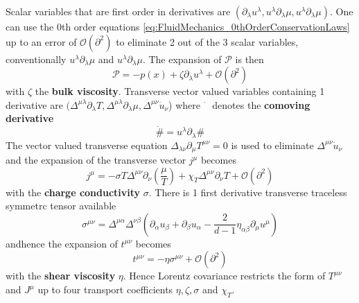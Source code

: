 Scalar variables that are first order in derivatives are $(\partial_\lambda u^\lambda,u^\lambda\partial_\lambda\mu,u^\lambda\partial_\lambda\mu)$. One can use the $0$th order equations \eqref{eq:FluidMechanics_0thOrderConservationLaws} up to an error of $\mathcal{O}(\partial^2)$ to eliminate 2 out of the 3 scalar variables, conventionally $u^\lambda\partial_\lambda\mu$ and $u^\lambda\partial_\lambda\mu$. The expansion of $\mathcal{P}$ is then
\begin{equation}
    \mathcal{P}=-p(x)+\zeta\partial_\lambda u^\lambda+\mathcal{O}(\partial^2)
\end{equation}
with $\zeta$ the \textbf{bulk viscosity}. Transverse vector valued variables containing 1 derivative are $(\Delta^{\mu\lambda}\partial_\lambda T,\Delta^{\mu\lambda}\partial_\lambda \mu,\Delta^{\mu\nu}\dot{u}_\nu$) where $\dot{\phantom{u}}$ denotes the \textbf{comoving derivative}
\begin{equation}
    \dot{\#}=u^\lambda\partial_\lambda\#
\end{equation}
The vector valued transverse equation $\Delta_{\lambda\nu}\partial_\mu T^{\mu\nu}=0$ is used to eliminate $\Delta^{\mu\nu}\dot{u}_\nu$ and the expansion of the transverse vector $j^\mu$ becomes
\begin{equation}
    j^\mu=-\sigma T\Delta^{\mu\nu}\partial_\nu(\frac{\mu}{T})+\chi_T\Delta^{\mu\nu}\partial_\nu T+\mathcal{O}(\partial^2)
\end{equation}
with the \textbf{charge conductivity} $\sigma$. There is 1 first derivative transverse traceless symmetrc tensor available 
\begin{equation}
    \sigma^{\mu\nu}=\Delta^{\mu\alpha}\Delta^{\nu\beta}(\partial_\alpha u_\beta+\partial_\beta u_\alpha-\frac{2}{d-1}\eta_{\alpha\beta}\partial_\mu u^\mu)
\end{equation}
andhence the expansion of $t^{\mu\nu}$ becomes
\begin{equation}
    t^{\mu\nu}=-\eta\sigma^{\mu\nu}+\mathcal{O}(\partial^2)
\end{equation}
with the \textbf{shear viscosity} $\eta$. Hence Lorentz covariance restricts the form of $T^{\mu\nu}$ and $J^\mu$ up to four transport coefficients $\eta,\zeta,\sigma$ and $\chi_T$.

\done{}

